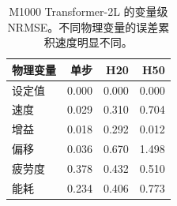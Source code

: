 
\begin{table}[H]
\centering
\caption{M1000 Transformer-2L 的变量级 NRMSE。不同物理变量的误差累积速度明显不同。}
\label{tab:per_variable}
\small
\begin{tabular}{lrrr}
\toprule
物理变量 & 单步 & H20 & H50 \\
\midrule
设定值 & 0.000 & 0.000 & 0.000 \\
速度 & 0.029 & 0.310 & 0.704 \\
增益 & 0.018 & 0.292 & 0.012 \\
偏移 & 0.036 & 0.670 & 1.498 \\
疲劳度 & 0.378 & 0.432 & 0.510 \\
能耗 & 0.234 & 0.406 & 0.773 \\
\bottomrule
\end{tabular}
\end{table}
